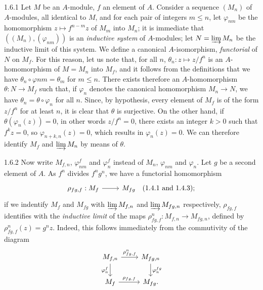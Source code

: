 \documentclass[../main.tex]{subfiles}
\begin{document}
\begin{cx}{1.6.1}
Let $M$ be an $A$-module, $f$ an element of $A$. Consider a sequence
$(M_n)$ of $A$-modules, all identical to $M$, and for each pair of integers
$m\leq n$, let $\varphi_{nm}$ be the homomorphism $z\mapsto f^{n-m}z$ of $M_m$
into $M_n$; it is immediate that $((M_n),(\varphi_{nm}))$ is an \emph{inductive system}
of $A$-modules; let $N=\varinjlim M_n$ be the inductive limit of this system. We define
a canonical $A$-isomorphism, \emph{functorial} of $N$ on $M_f$. For this reason, let us
note that, for all $n$, $\theta_n:z\mapsto z/f^n$ is an $A$-homomorphism of $M=M_n$ into
$M_f$, and it follows from the definitions that we have $\theta_n\circ\varphi{nm}=\theta_m$
for $m\leq n$. There exists therefore an $A$-homomorphism $\theta:N\to M_f$ such that, if
$\varphi_n$ denotes the canonical homomorphism $M_n\to N$, we have $\theta_n=\theta\circ\varphi_n$
for all $n$. Since, by hypothesis, every element of $M_f$ is of the form $z/f^n$ for at least $n$,
it is clear that $\theta$ is surjective. On the other hand, if $\theta(\varphi_n(z))=0$,
in other words $z/f^n=0$, there exists an integer $k>0$ such that $f^k z=0$, so $\varphi_{n+k,n}(z)=0$,
which results in $\varphi_n(z)=0$. We can therefore identify $M_f$ and $\varinjlim M_n$ by means
of $\theta$.
\end{cx}

\begin{cx}{1.6.2}
Now write $M_{f,n}$, $\varphi_{nm}^f$ and $\varphi_n^f$ instead of $M_n$, $\varphi_{nm}$ and
$\varphi_n$. Let $g$ be a second element of $A$. As $f^n$ divides $f^n g^n$, we have a functorial
homomorphism
\[\begin{tikzcd}
  \rho_{fg,f}:M_f\ar[r] & M_{fg}\quad(1.4.1\text{ and }1.4.3);
\end{tikzcd}\]
if we indentify $M_f$ and $M_{fg}$ with $\varinjlim M_{f,n}$ and $\varinjlim M_{fg,n}$
respectively, $\rho_{fg,f}$ identifies with the \emph{inductive limit} of the maps
$\rho_{fg,f}^n:M_{f,n}\to M_{fg,n}$, defined by $\rho_{fg,f}^n(z)=g^n z$. Indeed, this follows
immediately from the commutivity of the diagram
\[\begin{tikzcd}
  M_{f,n}\ar[r,"\rho_{fg,f}^n"]\ar[d,"\varphi_n^f"'] & M_{fg,n}\ar[d,"\varphi_n^{fg}"]\\
  M_f\ar[r,"\rho_{fg,f}"] & M_{fg}.
\end{tikzcd}\]
\end{cx}
\end{document}
